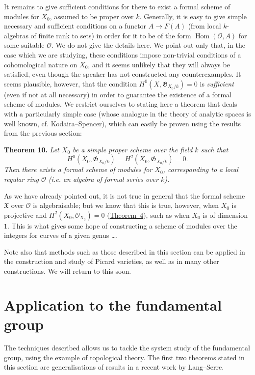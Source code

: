 \documentclass{article}
\newenvironment{itenv}[1]
  {\phantomsection\par\medskip\noindent\textbf{#1.}\itshape}
  {\par\medskip}
\newcommand{\scr}[1]{{\mathscr{#1}}}
\renewcommand{\cal}[1]{{\mathcal{#1}}}
\newcommand{\fk}{\mathfrak}
\DeclareMathOperator{\Hom}{Hom}
\newcommand{\oldpage}[1]{\marginpar{\footnotesize$\Big\vert$ \textit{p.~#1}}}
\begin{document}
\oldpage{182-17}
It remains to give sufficient conditions for there to exist a formal scheme of modules for $X_0$, assumed to be proper over $k$.
Generally, it is easy to give simple necessary and sufficient conditions on a functor $A\to F(A)$ (from local $k$-algebras of finite rank to sets) in order for it to be of the form $\Hom(\cal{O},A)$ for some suitable $\cal{O}$.
We do not give the details here.
We point out only that, in the case which we are studying, these conditions impose non-trivial conditions of a cohomological nature on $X_0$, and it seems unlikely that they will always be satisfied, even though the speaker has not constructed any counterexamples.
It seems plausible, however, that the condition $H^0(X,\fk{G}_{X_0/k})=0$ is \emph{sufficient} (even if not at all necessary) in order to guarantee the existence of a formal scheme of modules.
We restrict ourselves to stating here a theorem that deals with a particularly simple case (whose analogue in the theory of analytic spaces is well known, cf. Kodaira--Spencer), which can easily be proven using the results from the previous section:

\begin{itenv}{Theorem 10}
\label{theorem10}
  Let $X_0$ be a simple proper scheme over the field $k$ such that
  \[
    H^0(X_0,\fk{G}_{X_0/k}) = H^2(X_0,\fk{G}_{X_0/k}) = 0.
  \]
  Then there exists a formal scheme of modules for $X_0$, corresponding to a local regular ring $\cal{O}$ (i.e. an algebra of formal series over $k$).
\end{itenv}

As we have already pointed out, it is not true in general that the formal scheme $\fk{X}$ over $\cal{O}$ is algebraisable;
but we know that this is true, however, when $X_0$ is projective and $H^2(X_0,\scr{O}_{X_0})=0$ (\hyperref[theorem4]{Theorem~4}), such as when $X_0$ is of dimension~$1$.
This is what gives some hope of constructing a scheme of modules over the integers for curves of a given genus \ldots.

Note also that methods such as those described in this section can be applied in the construction and study of Picard varieties, as well as in many other constructions.
We will return to this soon.


\section{Application to the fundamental group}
\label{section8}

The techniques described allows us to tackle the system study of the fundamental group, using the example of topological theory.
The first two theorems stated in this section are generalisations of results in a recent work by Lang--Serre.
\end{document}
